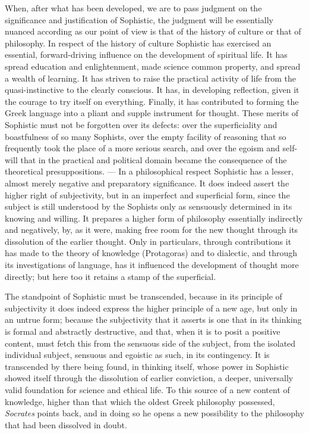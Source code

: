 When, after what has been developed, we are to pass judgment on the
significance and justification of Sophistic, the judgment will be essentially
nuanced according as our point of view is that of the history of culture or
that of philosophy. In respect of the history of culture Sophistic has
exercised an essential, forward-driving influence on the development of
spiritual life. It has spread education and enlightenment, made science
common property, and spread a wealth of learning. It has striven to raise
the practical activity of life from the quasi-instinctive to the clearly
conscious. It has, in developing reflection, given it the courage to try
itself on everything. Finally, it has contributed to forming the Greek
language into a pliant and supple instrument for thought. These merits of
Sophistic must not be forgotten over its defects: over the superficiality and
boastfulness of so many Sophists, over the empty facility of reasoning that
so frequently took the place of a more serious search, and over
the egoism and self-will that in the practical and political domain
became the consequence of the theoretical presuppositions. --- In a
philosophical respect Sophistic has a lesser, almost merely negative and
preparatory significance. It does indeed assert the higher right of
subjectivity, but in an imperfect and superficial form, since the subject is
still understood by the Sophists only as sensuously determined in its knowing
and willing. It prepares a higher form of philosophy essentially indirectly
and negatively, by, as it were, making free room for the new thought through
its dissolution of the earlier thought. Only in particulars, through
contributions it has made to the theory of knowledge (Protagoras) and to
dialectic, and through its investigations of language, has it influenced the
development of thought more directly; but here too it retains a stamp of the
superficial.

The standpoint of Sophistic must be transcended, because in its principle of
subjectivity it does indeed express the higher principle of a new age, but
only in an untrue form; because the subjectivity that it asserts is one that
in its thinking is formal and abstractly destructive, and that, when it is to
posit a positive content, must fetch this from the sensuous side of the
subject, from the isolated individual subject, sensuous and egoistic as such,
in its contingency. It is transcended by there being found, in thinking
itself, whose power in Sophistic showed itself through the dissolution of
earlier conviction, a deeper, universally valid foundation for science and
ethical life. To this source of a new content of knowledge, higher than that
which the oldest Greek philosophy possessed, \emph{Socrates} points back, and
in doing so he opens a new possibility to the philosophy that had been
dissolved in doubt.

